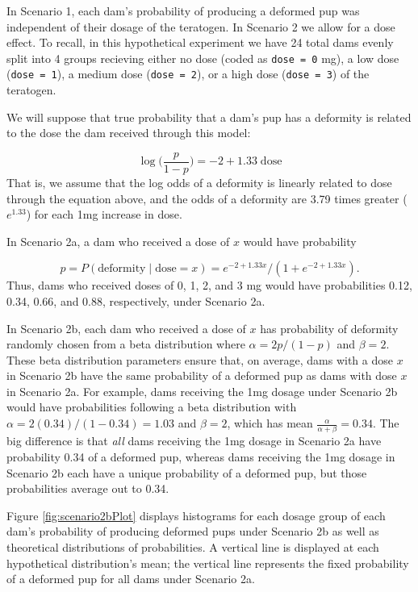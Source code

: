 \documentclass[
]{krantz}
\begin{document}
In Scenario 1, each dam's probability of producing a deformed pup was independent of their dosage of the teratogen. In Scenario 2 we allow for a dose effect. To recall, in this hypothetical experiment we have 24 total dams evenly split into 4 groups recieving either no dose (coded as \texttt{dose\ =\ 0} mg), a low dose (\texttt{dose\ =\ 1}), a medium dose (\texttt{dose\ =\ 2}), or a high dose (\texttt{dose\ =\ 3}) of the teratogen.

We will suppose that true probability that a dam's pup has a deformity is related to the dose the dam received through this model:

\[ \log \bigg(\frac{p}{1-p} \bigg) = -2 + 1.33\; \textrm{dose} \]
That is, we assume that the log odds of a deformity is linearly related to dose through the equation above, and the odds of a deformity are 3.79 times greater (\(e^{1.33}\)) for each 1mg increase in dose.

In Scenario 2a, a dam who received a dose of \(x\) would have probability

\[p = P(\textrm{deformity}\mid \textrm{dose} = x) = e^{-2+1.33x}/(1+e^{-2+1.33x}). \]
Thus, dams who received doses of 0, 1, 2, and 3 mg would have probabilities 0.12, 0.34, 0.66, and 0.88, respectively, under Scenario 2a.

In Scenario 2b, each dam who received a dose of \(x\) has probability of deformity randomly chosen from a beta distribution where \(\alpha = 2p/(1-p)\) and \(\beta = 2\). These beta distribution parameters ensure that, on average, dams with a dose \(x\) in Scenario 2b have the same probability of a deformed pup as dams with dose \(x\) in Scenario 2a. For example, dams receiving the 1mg dosage under Scenario 2b would have probabilities following a beta distribution with \(\alpha = 2(0.34)/(1-0.34) = 1.03\) and \(\beta = 2\), which has mean \(\frac{\alpha}{\alpha + \beta}=0.34\). The big difference is that \emph{all} dams receiving the 1mg dosage in Scenario 2a have probability 0.34 of a deformed pup, whereas dams receiving the 1mg dosage in Scenario 2b each have a unique probability of a deformed pup, but those probabilities average out to 0.34.

Figure \ref{fig:scenario2bPlot} displays histograms for each dosage group of each dam's probability of producing deformed pups under Scenario 2b as well as theoretical distributions of probabilities. A vertical line is displayed at each hypothetical distribution's mean; the vertical line represents the fixed probability of a deformed pup for all dams under Scenario 2a.
\end{document}

